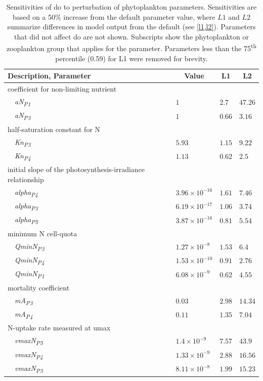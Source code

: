 \documentclass[letterpaper,12pt,oneside]{article}\usepackage[]{graphicx}\usepackage[]{color}
\begin{document}
\begin{table}[!tbp]
{\normalsize
\caption{Sensitivities of \ac{do} to perturbation of phytoplankton parameters.  Sensitivities are based on a 50\% increase from the default parameter value, where $L1$ and $L2$ summarize differences in model output from the default (see \cref{l1,l2}).  Parameters that did not affect \ac{do} are not shown.  Subscripts show the phytoplankton or zooplankton group that applies for the parameter. Parameters less than the 75\textsuperscript{th} percentile (0.59) for L1 were removed for brevity.\label{tab:phytosens}} 
\begin{center}
\begin{tabular}{llll}
\hline\hline
\multicolumn{1}{l}{Description, Parameter}&\multicolumn{1}{c}{Value}&\multicolumn{1}{c}{L1}&\multicolumn{1}{c}{L2}\tabularnewline
\hline
{coefficient for non-limiting nutrient}&&&\tabularnewline
~~\textit{aN\textsubscript{P1}}&$1$&$2.7$&$47.26$\tabularnewline
~~\textit{aN\textsubscript{P3}}&$1$&$0.66$&$3.16$\tabularnewline
\hline
{half-saturation constant for N}&&&\tabularnewline
~~\textit{Kn\textsubscript{P3}}&$5.93$&$1.15$&$9.22$\tabularnewline
~~\textit{Kn\textsubscript{P4}}&$1.13$&$0.62$&$2.5$\tabularnewline
\hline
{initial slope of the photosynthesis-irradiance relationship}&&&\tabularnewline
~~\textit{alpha\textsubscript{P4}}&$3.96\times 10^{-16}$&$1.61$&$7.46$\tabularnewline
~~\textit{alpha\textsubscript{P3}}&$6.19\times 10^{-17}$&$1.06$&$3.74$\tabularnewline
~~\textit{alpha\textsubscript{P5}}&$3.87\times 10^{-16}$&$0.81$&$5.54$\tabularnewline
\hline
{minimum N cell-quota}&&&\tabularnewline
~~\textit{QminN\textsubscript{P3}}&$1.27\times 10^{-8}$&$1.53$&$6.4$\tabularnewline
~~\textit{QminN\textsubscript{P4}}&$1.53\times 10^{-10}$&$0.91$&$2.76$\tabularnewline
~~\textit{QminN\textsubscript{P1}}&$6.08\times 10^{-9}$&$0.62$&$4.55$\tabularnewline
\hline
{mortality coefficient}&&&\tabularnewline
~~\textit{mA\textsubscript{P3}}&$0.03$&$2.98$&$14.34$\tabularnewline
~~\textit{mA\textsubscript{P4}}&$0.11$&$1.35$&$7.04$\tabularnewline
\hline
{N-uptake rate measured at umax}&&&\tabularnewline
~~\textit{vmaxN\textsubscript{P5}}&$1.4\times 10^{-9}$&$7.57$&$43.9$\tabularnewline
~~\textit{vmaxN\textsubscript{P4}}&$1.33\times 10^{-9}$&$2.88$&$16.56$\tabularnewline
~~\textit{vmaxN\textsubscript{P3}}&$8.11\times 10^{-8}$&$1.99$&$15.23$\tabularnewline

\end{tabular}
\end{center}}
\end{table}
\end{document}
